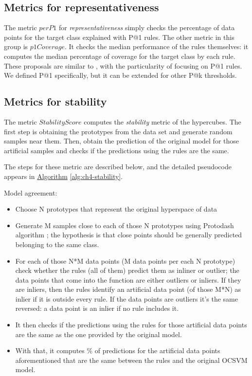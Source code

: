 \subsection{Metrics for representativeness}\label{subsec:RuleExtractionRepresentativeness}
The metric $perP1$ for \textit{representativeness} simply checks the percentage of data points for the target class explained with P@1 rules. The other metric in this group is $p1Coverage$. It checks the median performance of the rules themselves: it computes the median percentage of coverage for the target class by each rule. These proposals are similar to \parencite{vilone2020comparative}, with the particularity of focusing on P@1 rules. We defined P@1 specifically, but it can be extended for other P@k thresholds.

\subsection{Metrics for stability}\label{subsec:RuleExtractionStability}
The metric $StabilityScore$ computes the \textit{stability} metric of the hypercubes. The first step is obtaining the prototypes from the data set and generate random samples near them. Then, obtain the prediction of the original model for those artificial samples and checks if the predictions using the rules are the same.

The steps for these metric are described below, and the detailed pseudocode appears in \hyperref[alg:ch4-stability]{Algorithm} \ref{alg:ch4-stability}. 

Model agreement:
\begin{itemize}
    \setlength{\itemindent}{2em}
    \item Choose N prototypes that represent the original hyperspace of data
    \item Generate M samples close to each of those N prototypes using Protodash algorithm \parencite{gurumoorthy2019efficient}; the hypothesis is that close points should be generally predicted belonging to the same class.
    \item For each of those N*M data points (M data points per each N prototype) check whether the rules (all of them) predict them as inliner or outlier; the data points that come into the function are either outliers or inliers. If they are inliers,  then the rules identify an artificial data point (of those M*N) as inlier if it is outside every rule. If the data points are outliers it's the same reversed: a data point is an inlier if no rule includes it.
    \item It then checks if the predictions using the rules for those artificial data points are the same as the one provided by the original model.
    \item With that, it computes \% of predictions for the artificial data points aforementioned that are the same between the rules and the original OCSVM model.
\end{itemize}


